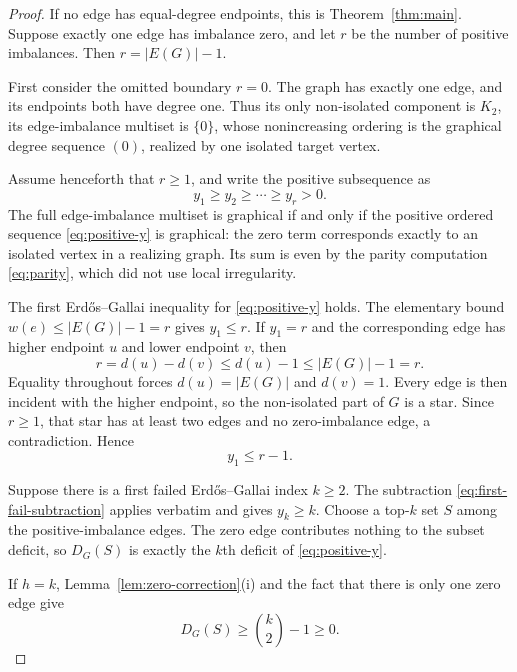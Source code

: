 \documentclass[a4paper,11pt]{amsart}
\numberwithin{equation}{section}
\theoremstyle{definition}
\theoremstyle{remark}
\begin{document}
\begin{proof}
If no edge has equal-degree endpoints, this is Theorem~\ref{thm:main}.  Suppose exactly one edge has imbalance zero, and let $r$ be the number of positive imbalances.  Then $r=\lvert E(G)\rvert-1$.

First consider the omitted boundary $r=0$.  The graph has exactly one edge, and its endpoints both have degree one.  Thus its only non-isolated component is $K_2$, its edge-imbalance multiset is $\{0\}$, whose nonincreasing ordering is the graphical degree sequence $(0)$, realized by one isolated target vertex.

Assume henceforth that $r\ge1$, and write the positive subsequence as
\begin{equation}
y_1\ge y_2\ge\cdots\ge y_r>0.
\label{eq:positive-y}
\end{equation}
The full edge-imbalance multiset is graphical if and only if the positive ordered sequence \eqref{eq:positive-y} is graphical: the zero term corresponds exactly to an isolated vertex in a realizing graph.  Its sum is even by the parity computation \eqref{eq:parity}, which did not use local irregularity.

The first Erd\H{o}s--Gallai inequality for \eqref{eq:positive-y} holds.  The elementary bound $w(e)\le\lvert E(G)\rvert-1=r$ gives $y_1\le r$.  If $y_1=r$ and the corresponding edge has higher endpoint $u$ and lower endpoint $v$, then
\[
r=d(u)-d(v)\le d(u)-1\le\lvert E(G)\rvert-1=r.
\]
Equality throughout forces $d(u)=\lvert E(G)\rvert$ and $d(v)=1$.  Every edge is then incident with the higher endpoint, so the non-isolated part of $G$ is a star.  Since $r\ge1$, that star has at least two edges and no zero-imbalance edge, a contradiction.  Hence
\begin{equation}
y_1\le r-1.
\label{eq:y1-bound}
\end{equation}

Suppose there is a first failed Erd\H{o}s--Gallai index $k\ge2$.  The subtraction \eqref{eq:first-fail-subtraction} applies verbatim and gives $y_k\ge k$.  Choose a top-$k$ set $S$ among the positive-imbalance edges.  The zero edge contributes nothing to the subset deficit, so $D_G(S)$ is exactly the $k$th deficit of \eqref{eq:positive-y}.

If $h=k$, Lemma~\ref{lem:zero-correction}(i) and the fact that there is only one zero edge give
\begin{equation}
D_G(S)\ge\binom{k}{2}-1\ge0.
\label{eq:onezero-hk}
\end{equation}


\end{proof}
\end{document}
